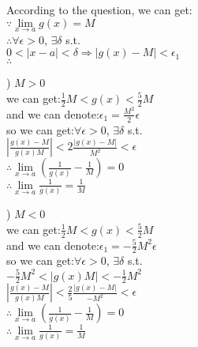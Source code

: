 \documentclass{article}
\begin{document}
According to the question, we can get:\\

$\because$\qquad$\lim \limits_{x \to a}g(x)=M$\\

$\therefore$\qquad$\forall\epsilon>0$, $\exists\delta$ s.t.\\

\qquad\quad$0<|x-a|<\delta\Rightarrow|g(x)-M|<\epsilon_1$\\

$\therefore$\qquad
\begin{flushleft}
\qquad{}) $M>0$\\
\qquad\quad we can get:\quad$\displaystyle\frac{1}{2}M<g(x)<\frac{5}{2}M$\\
\qquad\quad and we can denote:\quad$\displaystyle\epsilon_1=\frac{M^2}{2}\epsilon$\\
\qquad\quad so we can get:$\forall\epsilon>0$, $\exists\delta$ s.t. \\
\qquad\quad $\left|\displaystyle\frac{g(x)-M}{g(x)M}\right|<2\frac{|g(x)-M|}{M^2}<\epsilon$\\
\qquad\quad $\therefore$\qquad$\lim \limits_{x \to a}\left(\displaystyle\frac{1}{g(x)}-\frac{1}{M}\right)=0$\\
\qquad\quad $\therefore$\qquad$\lim \limits_{x \to a}\displaystyle\frac{1}{g(x)}=\frac{1}{M}$\\
\end{flushleft}
\begin{flushleft}
\qquad{}) $M<0$\\
\qquad\quad we can get:\quad$\displaystyle\frac{1}{2}M<g(x)<\frac{5}{2}M$\\
\qquad\quad and we can denote:\quad$\displaystyle\epsilon_1=-\frac{5}{2}M^2\epsilon$\\
\qquad\quad so we can get:$\forall\epsilon>0$, $\exists\delta$ s.t. \\
\qquad\quad $-\displaystyle\frac{5}{2}M^2<|g(x)M|<-\frac{1}{2}M^2$\\
\qquad\quad $\left|\displaystyle\frac{g(x)-M}{g(x)M}\right|<\frac{2}{5}\frac{|g(x)-M|}{-M^2}<\epsilon$\\
\qquad\quad $\therefore$\qquad$\lim \limits_{x \to a}\left(\displaystyle\frac{1}{g(x)}-\frac{1}{M}\right)=0$\\
\qquad\quad $\therefore$\qquad$\lim \limits_{x \to a}\displaystyle\frac{1}{g(x)}=\frac{1}{M}$\\
\end{flushleft}
\end{document}
